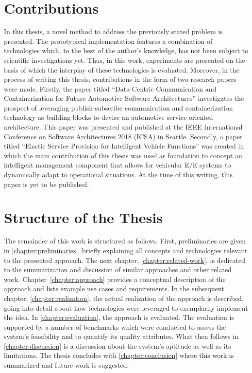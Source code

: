 \section{Contributions}
In this thesis, a novel method to address the previously stated problem is presented. The prototypical implementation features a combination of technologies which, to the best of the author's knowledge, has not been subject to scientific investigations yet. Thus, in this work, experiments are presented on the basis of which the interplay of these technologies is evaluated.
Moreover, in the process of writing this thesis, contributions in the form of two research papers were made. 
Firstly, the paper titled ``Data-Centric Communication and Containerization for Future Automotive Software Architectures'' \cite{kugele:hettler:peter:icsa18} investigates the prospect of leveraging publish-subscribe communication and containerization technology as building blocks to devise an automotive service-oriented architecture. This paper was presented and published at the IEEE International Conference on Software Architectures 2018 (ICSA) in Seattle. 
Secondly, a paper titled ``Elastic Service Provision for Intelligent Vehicle Functions'' \cite{kugele:hettler:itsc} was created in which the main contribution of this thesis was used as foundation to concept an intelligent management component that allows for vehicular E/E systems to dynamically adapt to operational situations. At the time of this writing, this paper is yet to be published.
%
%
%
%
%
%
%
%
%
%
\section{Structure of the Thesis}
The remainder of this work is structured as follows. First, preliminaries are given in \autoref{chapter:preliminaries}, briefly explaining all concepts and technologies relevant to the presented approach. The next chapter, \autoref{chapter:related-work}, is dedicated to the summarization and discussion of similar approaches and other related work. Chapter~\ref{chapter:approach} provides a conceptual description of the approach and lists example use cases and requirements. In the subsequent chapter, \autoref{chapter:realization}, the actual realization of the approach is described, going into detail about how technologies were leveraged to exemplarily implement the idea. In \autoref{chapter:evaluation}, the approach is evaluated. The evaluation is supported by a number of benchmarks which were conducted to assess the system's feasibility and to quantify its quality attributes. What then follows in \autoref{chapter:discussion} is a discussion about the system's aptitude as well as its limitations. The thesis concludes with \autoref{chapter:conclusion} where this work is summarized and future work is suggested.

%
%
%
%
%
%
%
%
%
%
%
%
%
%
%
%
%
%
%
%
%
%
%
%
%
%
%
%
%
%
%
%
%
%
%
%
%
%
